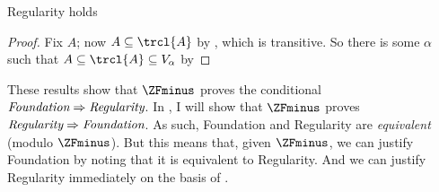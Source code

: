 \documentclass[../../../include/open-logic-section]{subfiles}
\begin{document}
\begin{thm}
	Regularity holds
\end{thm}
\begin{proof}
	Fix $A$; now $A \subseteq \trcl{A}$ by , which is transitive. So there is some $\alpha$ such that $A \subseteq \trcl{A} \subseteq V_\alpha$ by 
\end{proof}\noindent
These results show that $\ZFminus$ proves the conditional $\emph{Foundation}\Rightarrow\emph{Regularity}$. In , I will show that  $\ZFminus$ proves $\emph{Regularity}\Rightarrow\emph{Foundation}$. As such, Foundation and Regularity are \emph{equivalent} (modulo $\ZFminus$). But this means that, given $\ZFminus$, we can justify Foundation by noting that it is equivalent to Regularity. And we can justify Regularity immediately on the basis of \stageshier{}. 
\end{document}
